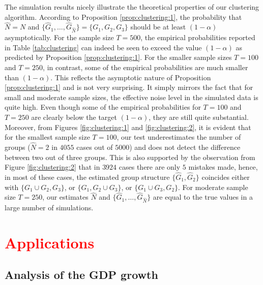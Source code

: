 \documentclass[a4paper,12pt]{article}
\begin{document}
The simulation results nicely illustrate the theoretical properties of our clustering algorithm. According to Proposition \ref{prop:clustering:1}, the probability that $\widehat{N} = N$ and $\{ \widehat{G}_1,\ldots,\widehat{G}_{\widehat{N}}\} = \{G_1,G_2,G_3\}$ should be at least $(1-\alpha)$ asymptotically. For the sample size $T = 500$, the empirical probabilities reported in Table \ref{tab:clustering} can indeed be seen to exceed the value $(1-\alpha)$ as predicted by Proposition \ref{prop:clustering:1}. %
For the smaller sample sizes $T=100$ and $T=250$, in contrast, some of the empirical probabilities are much smaller than $(1-\alpha)$. This reflects the asymptotic nature of Proposition \ref{prop:clustering:1} and is not very surprising. It simply mirrors the fact that for small and moderate sample sizes, the effective noise level in the simulated data is quite high. Even though some of the empirical probabilities for $T=100$ and $T=250$ are clearly below the target $(1-\alpha)$, they are still quite substantial. Moreover, from Figures \ref{fig:clustering:1} and \ref{fig:clustering:2}, it is evident that for the smallest sample size $T =100$, our test underestimates the number of groups ($\widehat{N} = 2$ in $4055$ cases out of $5000$) and does not detect the difference between two out of three groups. This is also supported by the observation from Figure \ref{fig:clustering:2} that in $3924$ cases there are only $5$ mistakes made, hence, in most of these cases, the estimated group structure $\{ \widehat{G}_1, \widehat{G}_{2}\}$ coincides either with  $\{ G_1 \cup G_2,G_3\}$, or  $\{ G_1, G_2\cup G_3\}$, or $ \{ G_1 \cup G_3,G_2\}$. For moderate sample size $T = 250$, our estimates $\widehat{N}$ and $\{ \widehat{G}_1,\ldots,\widehat{G}_{\widehat{N}} \}$ are equal to the true values in a large number of simulations. 


\section{\textcolor{red}{Applications}}\label{sec:app}
\subsection{Analysis of the GDP growth}\label{subsec:app:gdp}
\end{document}

